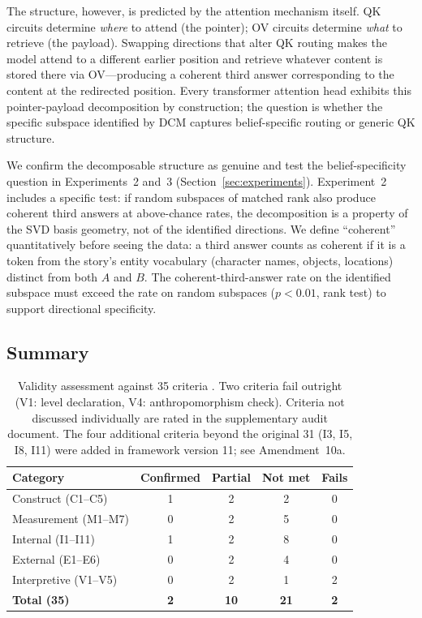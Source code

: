 \documentclass{article}
\begin{document}
The structure, however, is predicted by the attention mechanism itself. QK circuits determine \emph{where} to attend (the pointer); OV circuits determine \emph{what} to retrieve (the payload). Swapping directions that alter QK routing makes the model attend to a different earlier position and retrieve whatever content is stored there via OV---producing a coherent third answer corresponding to the content at the redirected position. Every transformer attention head exhibits this pointer-payload decomposition by construction; the question is whether the specific subspace identified by DCM captures belief-specific routing or generic QK structure.

We confirm the decomposable structure as genuine and test the belief-specificity question in Experiments~2 and~3 (Section~\ref{sec:experiments}). Experiment~2 includes a specific test: if random subspaces of matched rank also produce coherent third answers at above-chance rates, the decomposition is a property of the SVD basis geometry, not of the identified directions. We define ``coherent'' quantitatively before seeing the data: a third answer counts as coherent if it is a token from the story's entity vocabulary (character names, objects, locations) distinct from both $A$ and $B$. The coherent-third-answer rate on the identified subspace must exceed the rate on random subspaces ($p < 0.01$, rank test) to support directional specificity.

\subsection{Summary}

\begin{table}[t]
\centering
\caption{Validity assessment against 35 criteria \citep{tower2026mechval}. Two criteria fail outright (V1: level declaration, V4: anthropomorphism check). Criteria not discussed individually are rated in the supplementary audit document. The four additional criteria beyond the original 31 (I3, I5, I8, I11) were added in framework version 11; see Amendment~10a.}
\label{tab:validity}
\begin{tabular}{lcccc}
\toprule
Category & Confirmed & Partial & Not met & Fails \\
\midrule
Construct (C1--C5) & 1 & 2 & 2 & 0 \\
Measurement (M1--M7) & 0 & 2 & 5 & 0 \\
Internal (I1--I11) & 1 & 2 & 8 & 0 \\
External (E1--E6) & 0 & 2 & 4 & 0 \\
Interpretive (V1--V5) & 0 & 2 & 1 & 2 \\
\midrule
\textbf{Total (35)} & \textbf{2} & \textbf{10} & \textbf{21} & \textbf{2} \\
\bottomrule
\end{tabular}
\end{table}
\end{document}
